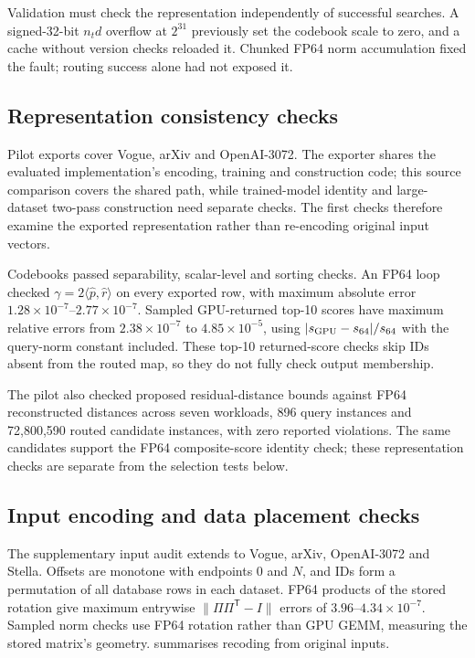 Validation must check the representation independently of successful
searches. A signed-32-bit $n_td$ overflow at $2^{31}$ previously set the
codebook scale to zero, and a cache without version checks reloaded it.
Chunked FP64 norm accumulation fixed the fault; routing success alone
had not exposed it.

\subsection{Representation consistency checks}

Pilot exports cover Vogue, arXiv and OpenAI-3072. The exporter shares
the evaluated implementation's encoding, training and construction code;
this source comparison covers the shared path, while trained-model
identity and large-dataset two-pass construction need separate checks.
The first checks therefore examine the exported representation rather
than re-encoding original input vectors.

Codebooks passed separability, scalar-level and sorting checks. An FP64
loop checked $\gamma=2\langle\widehat p,\widehat r\rangle$ on every exported
row, with maximum absolute error $1.28\times10^{-7}$--$2.77\times10^{-7}$.
Sampled GPU-returned top-10 scores have maximum relative errors from
$2.38\times10^{-7}$ to $4.85\times10^{-5}$, using
$|s_{\rm GPU}-s_{64}|/s_{64}$ with the query-norm constant included.
These top-10 returned-score checks skip IDs absent from the routed map, so
they do not fully check output membership.

The pilot also checked proposed residual-distance bounds against FP64
reconstructed distances across seven workloads, 896 query instances
and 72,800,590 routed candidate instances, with zero reported violations.
The same candidates support the FP64 composite-score identity check;
these representation checks are separate from the selection tests below.

\subsection{Input encoding and data placement checks}
\label{sec:4-representation-audit}

The supplementary input audit extends to Vogue, arXiv, OpenAI-3072 and
Stella. Offsets are monotone with endpoints 0 and $N$, and IDs form a
permutation of all database rows in each dataset. FP64 products of the
stored rotation give maximum entrywise $\|\Pi\Pi^{\mathsf T}-I\|$ errors
of $3.96$--$4.34\times10^{-7}$. Sampled norm checks use FP64 rotation
rather than GPU GEMM, measuring the stored matrix's geometry.
 summarises recoding from original inputs.

